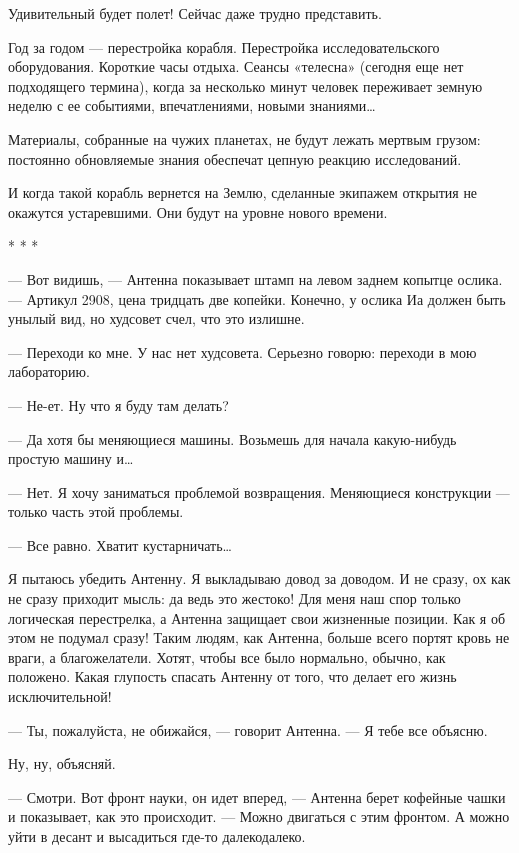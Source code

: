    Удивительный будет полет! Сейчас даже трудно представить.

   Год  за  годом  —  перестройка  корабля.  Перестройка   исследовательского
   оборудования. Короткие  часы отдыха.  Сеансы  «телесна» (сегодня  еще  нет
   подходящего термина), когда за  несколько минут человек переживает  земную
   неделю с ее событиями, впечатлениями, новыми знаниями…

   Материалы, собранные на  чужих планетах, не  будут лежать мертвым  грузом:
   постоянно обновляемые знания обеспечат цепную реакцию исследований.

   И когда такой корабль  вернется на Землю,  сделанные экипажем открытия  не
   окажутся устаревшими. Они будут на уровне нового времени.

                                     * * *

   — Вот видишь, — Антенна показывает штамп на левом заднем копытце ослика. —
   Артикул 2908, цена тридцать две копейки. Конечно, у ослика Иа должен  быть
   унылый вид, но худсовет счел, что это излишне.

   — Переходи ко мне.  У нас нет худсовета.  Серьезно говорю: переходи в  мою
   лабораторию.

   — Не-ет. Ну что я буду там делать?

   — Да хотя бы меняющиеся  машины. Возьмешь для начала какую-нибудь  простую
   машину и…

   — Нет. Я хочу заниматься  проблемой возвращения. Меняющиеся конструкции  —
   только часть этой проблемы.

   — Все равно. Хватит кустарничать…

   Я пытаюсь убедить Антенну. Я выкладываю  довод за доводом. И не сразу,  ох
   как не сразу приходит мысль: да ведь это жестоко! Для меня наш спор только
   логическая перестрелка, а Антенна защищает  свои жизненные позиции. Как  я
   об этом не подумал  сразу! Таким людям, как  Антенна, больше всего  портят
   кровь не враги, а благожелатели. Хотят, чтобы все было нормально,  обычно,
   как положено. Какая глупость спасать Антенну от того, что делает его жизнь
   исключительной!

   — Ты, пожалуйста, не обижайся, — говорит Антенна. — Я тебе все объясню.

   Ну, ну, объясняй.

   — Смотри. Вот фронт науки, он идет вперед, — Антенна берет кофейные  чашки
   и показывает, как  это происходит.  — Можно  двигаться с  этим фронтом.  А
   можно уйти в десант и высадиться где-то далекодалеко.

